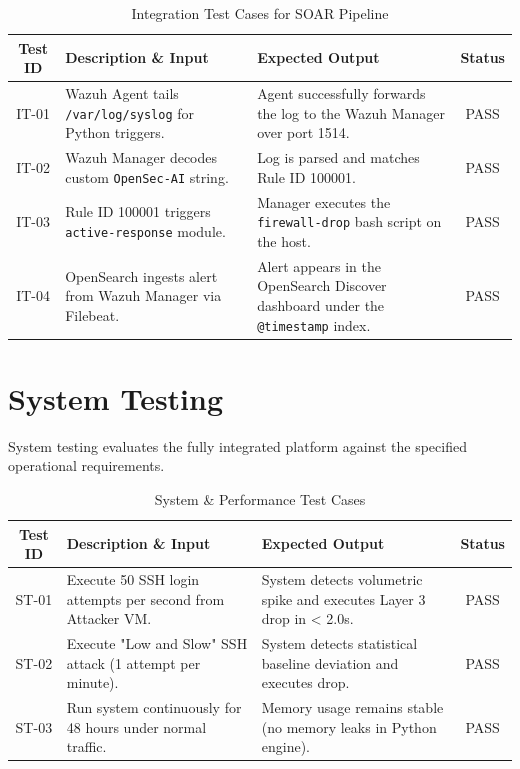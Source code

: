 \documentclass[12pt, a4paper]{report}
\begin{document}
	\begin{table}[H]
		\centering
		\caption{Integration Test Cases for SOAR Pipeline}
		\vspace{0.2cm}
		\begin{tabularx}{\textwidth}{|c|X|X|c|}
			\hline
			\textbf{Test ID} & \textbf{Description \& Input} & \textbf{Expected Output} & \textbf{Status} \\
			\hline
			IT-01 & Wazuh Agent tails \texttt{/var/log/syslog} for Python triggers. & Agent successfully forwards the log to the Wazuh Manager over port 1514. & PASS \\
			\hline
			IT-02 & Wazuh Manager decodes custom \texttt{OpenSec-AI} string. & Log is parsed and matches Rule ID 100001. & PASS \\
			\hline
			IT-03 & Rule ID 100001 triggers \texttt{active-response} module. & Manager executes the \texttt{firewall-drop} bash script on the host. & PASS \\
			\hline
			IT-04 & OpenSearch ingests alert from Wazuh Manager via Filebeat. & Alert appears in the OpenSearch Discover dashboard under the \texttt{@timestamp} index. & PASS \\
			\hline
		\end{tabularx}
	\end{table}
	
	\section{System Testing}
	System testing evaluates the fully integrated platform against the specified operational requirements.
	
	\begin{table}[H]
		\centering
		\caption{System \& Performance Test Cases}
		\vspace{0.2cm}
		\begin{tabularx}{\textwidth}{|c|X|X|c|}
			\hline
			\textbf{Test ID} & \textbf{Description \& Input} & \textbf{Expected Output} & \textbf{Status} \\
			\hline
			ST-01 & Execute 50 SSH login attempts per second from Attacker VM. & System detects volumetric spike and executes Layer 3 drop in < 2.0s. & PASS \\
			\hline
			ST-02 & Execute "Low and Slow" SSH attack (1 attempt per minute). & System detects statistical baseline deviation and executes drop. & PASS \\
			\hline
			ST-03 & Run system continuously for 48 hours under normal traffic. & Memory usage remains stable (no memory leaks in Python engine). & PASS \\
			\hline
		\end{tabularx}
	\end{table}
	
\end{document}
